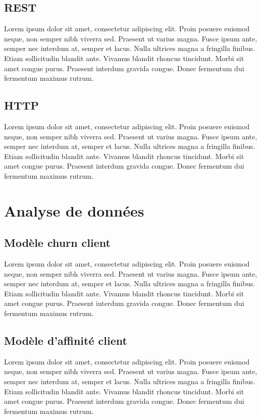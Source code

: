 \subsection{REST} 
\label{app:rest}
Lorem ipsum dolor sit amet, consectetur adipiscing elit. Proin posuere euismod neque, non semper nibh viverra sed. Praesent ut varius magna. Fusce ipsum ante, semper nec interdum at, semper et lacus. Nulla ultrices magna a fringilla finibus. Etiam sollicitudin blandit ante. Vivamus blandit rhoncus tincidunt. Morbi sit amet congue purus. Praesent interdum gravida congue. Donec fermentum dui fermentum maximus rutrum.
\subsection{HTTP} 
\label{app:http}
Lorem ipsum dolor sit amet, consectetur adipiscing elit. Proin posuere euismod neque, non semper nibh viverra sed. Praesent ut varius magna. Fusce ipsum ante, semper nec interdum at, semper et lacus. Nulla ultrices magna a fringilla finibus. Etiam sollicitudin blandit ante. Vivamus blandit rhoncus tincidunt. Morbi sit amet congue purus. Praesent interdum gravida congue. Donec fermentum dui fermentum maximus rutrum.

\section{Analyse de données}

\subsection{Modèle churn client} 
\label{app:churn}
Lorem ipsum dolor sit amet, consectetur adipiscing elit. Proin posuere euismod neque, non semper nibh viverra sed. Praesent ut varius magna. Fusce ipsum ante, semper nec interdum at, semper et lacus. Nulla ultrices magna a fringilla finibus. Etiam sollicitudin blandit ante. Vivamus blandit rhoncus tincidunt. Morbi sit amet congue purus. Praesent interdum gravida congue. Donec fermentum dui fermentum maximus rutrum.
\subsection{Modèle d'affinité client} 
\label{app:affinity}

Lorem ipsum dolor sit amet, consectetur adipiscing elit. Proin posuere euismod neque, non semper nibh viverra sed. Praesent ut varius magna. Fusce ipsum ante, semper nec interdum at, semper et lacus. Nulla ultrices magna a fringilla finibus. Etiam sollicitudin blandit ante. Vivamus blandit rhoncus tincidunt. Morbi sit amet congue purus. Praesent interdum gravida congue. Donec fermentum dui fermentum maximus rutrum.

